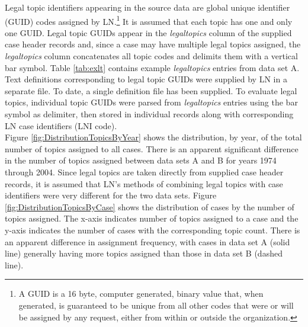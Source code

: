 \documentclass[10pt, letterpaper]{article}
\begin{document}
\begin{spacing}{1.0}
Legal topic identifiers appearing in the source data are global unique identifier (GUID) codes assigned by LN.\footnote{A GUID is a 16 byte, computer generated, binary value that, when generated, is guaranteed to be unique from all other codes that were or will be assigned by any request, either from within or outside the organization.} It is assumed that each topic has one and only one GUID.  Legal topic GUIDs appear in the \textit{legaltopics} column of the supplied case header records and, since a case may have multiple legal topics assigned, the \textit{legaltopics} column concatenates all topic codes and delimits them with a vertical bar symbol.  Table \ref{tab:exlt} contains example \textit{legaltopics} entries from data set A.  Text definitions corresponding to legal topic GUIDs were supplied by LN in a separate file.  To date, a single definition file has been supplied.  To evaluate legal topics, individual topic GUIDs were parsed from \textit{legaltopics} entries using the bar symbol as delimiter, then stored in individual records along with corresponding LN case identifiers (LNI code).\\

Figure \ref{fig:DistributionTopicsByYear} shows the distribution, by year, of the total number of topics assigned to all cases.  There is an apparent significant difference in the number of topics assigned between data sets A and B for years 1974 through 2004.  Since legal topics are taken directly from supplied case header records, it is assumed that LN's methods of combining legal topics with case identifiers were very different for the two data sets.  Figure \ref{fig:DistributionTopicsByCase} shows the distribution of cases by the number of topics assigned.  The x-axis indicates number of topics assigned to a case and the y-axis indicates the number of cases with the corresponding topic count.  There is an apparent difference in assignment frequency, with cases in data set A (solid line) generally having more topics assigned than those in data set B (dashed line).


\vspace{0.25in}


\end{spacing}
\end{document}
